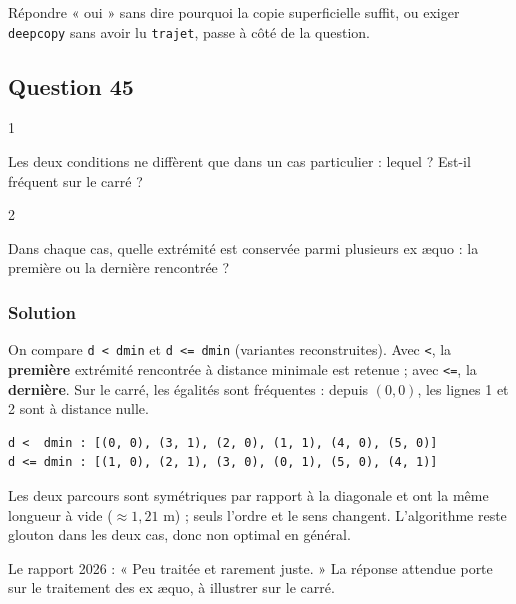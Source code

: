 \documentclass[11pt,a4paper]{article}
\begin{document}
\begin{piege}

Répondre « oui » sans dire pourquoi la copie superficielle suffit, ou exiger \texttt{deepcopy} sans avoir lu \texttt{trajet}, passe à côté de la question.

\end{piege}

\hypertarget{question-45}{%
\subsection{Question 45}\label{question-45}}

\begin{indication}{1}

Les deux conditions ne diffèrent que dans un cas particulier : lequel ? Est-il fréquent sur le carré ?

\end{indication}

\begin{indication}{2}

Dans chaque cas, quelle extrémité est conservée parmi plusieurs ex æquo : la première ou la dernière rencontrée ?

\end{indication}

\hypertarget{solution-44}{%
\subsubsection{Solution}\label{solution-44}}

On compare \texttt{d\ \textless{}\ dmin} et \texttt{d\ \textless{}=\ dmin} (variantes reconstruites). Avec \texttt{\textless{}}, la \textbf{première} extrémité rencontrée à distance minimale est retenue ; avec \texttt{\textless{}=}, la \textbf{dernière}. Sur le carré, les égalités sont fréquentes : depuis \((0,0)\), les lignes 1 et 2 sont à distance nulle.

\begin{lstlisting}
d <  dmin : [(0, 0), (3, 1), (2, 0), (1, 1), (4, 0), (5, 0)]
d <= dmin : [(1, 0), (2, 1), (3, 0), (0, 1), (5, 0), (4, 1)]
\end{lstlisting}

Les deux parcours sont symétriques par rapport à la diagonale et ont la même longueur à vide (\(\approx 1{,}21\) m) ; seuls l'ordre et le sens changent. L'algorithme reste glouton dans les deux cas, donc non optimal en général.

\begin{jury}

Le rapport 2026 : « Peu traitée et rarement juste. » La réponse attendue porte sur le traitement des ex æquo, à illustrer sur le carré.

\end{jury}
\end{document}

